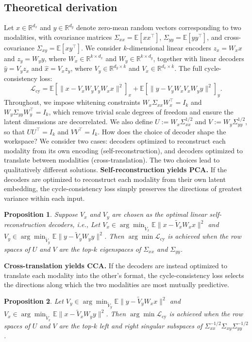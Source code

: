 \documentclass{ccn}  %
\newtheorem{prop}{Proposition} %
\begin{document}
\subsection{Theoretical derivation}
Let \(x \in \mathbb{R}^{d_x}\) and \(y \in \mathbb{R}^{d_y}\) denote zero-mean random vectors corresponding to two modalities, with covariance matrices \(\Sigma_{xx} = \mathbb{E}[xx^\top]\), \(\Sigma_{yy} = \mathbb{E}[yy^\top]\), and cross-covariance \(\Sigma_{xy} = \mathbb{E}[xy^\top]\). We consider \(k\)-dimensional linear encoders \(z_x = W_x x\) and \(z_y = W_y y\), where \(W_x \in \mathbb{R}^{k \times d_x}\) and \(W_y \in \mathbb{R}^{k \times d_y}\), together with linear decoders \(\hat y = V_y z_x\) and \(\hat x = V_x z_y\), where \(V_y \in \mathbb{R}^{d_y \times k}\) and \(V_x \in \mathbb{R}^{d_x \times k}\). The full cycle-consistency loss:
\[
\mathcal L_{\mathrm{cy}} = \mathbb E\!\left[\|x - V_x W_y V_y W_x x\|^2\right]_{x} + \mathbb E\!\left[\|y - V_y W_x V_x W_y y\|^2\right]_{y}.
\]
Throughout, we impose whitening constraints \(W_x \Sigma_{xx} W_x^\top = I_k\) and \(W_y \Sigma_{yy} W_y^\top = I_k\), which remove trivial scale degrees of freedom and ensure the latent dimensions are decorrelated. We also define \(U := W_x \Sigma_{xx}^{1/2}\) and \(V := W_y \Sigma_{yy}^{1/2}\), so that \(UU^\top = I_k\) and \(VV^\top = I_k\).
How does the choice of decoder shape the workspace? We consider two cases: decoders optimized to reconstruct each modality from its own encoding (self-reconstruction), and decoders optimized to translate between modalities (cross-translation). The two choices lead to qualitatively different solutions.
\textbf{Self-reconstruction yields PCA.} If the decoders are optimized to reconstruct each modality from their own latent embedding, the cycle-consistency loss simply preserves the directions of greatest variance within each input.
\begin{prop}
Suppose \(V_x\) and \(V_y\) are chosen as the optimal linear self-reconstruction decoders, i.e.,
Let \(V_x\in\arg\min_{\tilde V_x}\mathbb E\|x-\tilde V_xW_xx\|^2\) and \(V_y\in\arg\min_{\tilde V_y}\mathbb E\|y-\tilde V_yW_yy\|^2\). Then \(\arg\min \mathcal L_{\mathrm{cy}}\) is achieved when the row spaces of \(U\) and \(V\) are the top-\(k\) eigenspaces of \(\Sigma_{xx}\) and \(\Sigma_{yy}\).
\end{prop}
\textbf{Cross-translation yields CCA.} If the decoders are instead optimized to translate each modality into the other's format, the cycle-consistency loss selects the directions along which the two modalities are most mutually predictive.
\begin{prop}
Let \(V_y\in\arg\min_{\tilde V_y}\mathbb E\|y-\tilde V_yW_xx\|^2\) and \(V_x\in\arg\min_{\tilde V_x}\mathbb E\|x-\tilde V_xW_yy\|^2\). Then \(\arg\min \mathcal L_{\mathrm{cy}}\) is achieved when the row spaces of \(U\) and \(V\) are the top-\(k\) left and right singular subspaces of \(\Sigma_{xx}^{-1/2}\Sigma_{xy}\Sigma_{yy}^{-1/2}\).
\end{prop}
\end{document}
